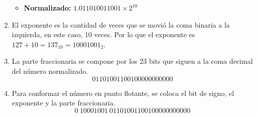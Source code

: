 \begin{enumerate}
\begin{itemize}
        \item \textbf{Normalizado:} $1.011010011001 \times 2^{10}$
    \end{itemize}
    \item El exponente es la cantidad de veces que se movió la coma binaria a la izquierda, en este caso, 10 veces. Por lo que el exponente es $127 + 10 = 137_{10} = 10001001_2$.
    \item La parte fraccionaria se compone por los 23 bits que siguen a la coma decimal del número normalizado.
    \begin{equation*}
        01101001100100000000000
    \end{equation*}
    \item Para conformar el número en punto flotante, se coloca el bit de signo, el exponente y la parte fraccionaria.
    \begin{equation*}
        0 \ 10001001 \ 01101001100100000000000
    \end{equation*}
\end{enumerate} 